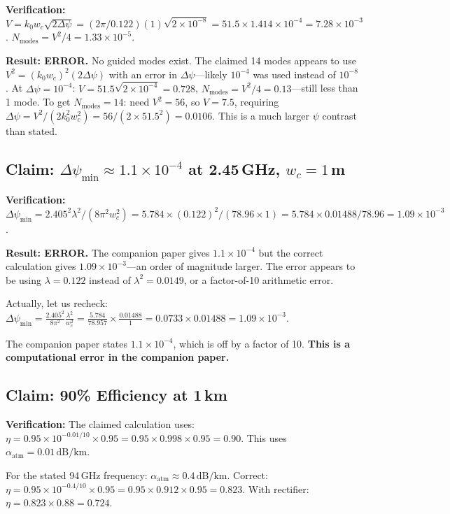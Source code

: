 \documentclass[journal,twocolumn]{IEEEtran}
\begin{document}
\textbf{Verification:}
$V = k_0 w_c \sqrt{2\Delta\psi}
= (2\pi/0.122)(1)\sqrt{2\times10^{-8}}
= 51.5 \times 1.414\times10^{-4} = 7.28\times10^{-3}$.
$N_\text{modes} = V^2/4 = 1.33\times10^{-5}$.

\textbf{Result: ERROR.} No guided modes exist. The claimed 14 modes
appears to use $V^2 = (k_0 w_c)^2(2\Delta\psi)$ with an error in
$\Delta\psi$---likely $10^{-4}$ was used instead of $10^{-8}$.
At $\Delta\psi = 10^{-4}$:
$V = 51.5\sqrt{2\times10^{-4}} = 0.728$,
$N_\text{modes} = V^2/4 = 0.13$---still less than 1 mode.
To get $N_\text{modes} = 14$: need $V^2 = 56$, so $V = 7.5$,
requiring $\Delta\psi = V^2/(2k_0^2 w_c^2) = 56/(2\times51.5^2)
= 0.0106$. This is a much larger $\psi$ contrast than stated.

\subsection{Claim: $\Delta\psi_\text{min} \approx 1.1\times10^{-4}$
at 2.45\,GHz, $w_c = 1$\,m}

\textbf{Verification:}
$\Delta\psi_\text{min} = 2.405^2\lambda^2/(8\pi^2 w_c^2)
= 5.784\times(0.122)^2/(78.96\times1)
= 5.784\times0.01488/78.96 = 1.09\times10^{-3}$.

\textbf{Result: ERROR.} The companion paper gives $1.1\times10^{-4}$
but the correct calculation gives $1.09\times10^{-3}$---an order of
magnitude larger. The error appears to be using $\lambda = 0.122$
instead of $\lambda^2 = 0.0149$, or a factor-of-10 arithmetic error.

Actually, let us recheck:
$\Delta\psi_\text{min} = \frac{2.405^2}{8\pi^2}\frac{\lambda^2}{w_c^2}
= \frac{5.784}{78.957}\times\frac{0.01488}{1} = 0.0733\times0.01488
= 1.09\times10^{-3}$.

The companion paper states $1.1\times10^{-4}$, which is off by a factor
of 10. \textbf{This is a computational error in the companion paper.}

\subsection{Claim: 90\% Efficiency at 1\,km}

\textbf{Verification:} The claimed calculation uses:
$\eta = 0.95 \times 10^{-0.01/10} \times 0.95 = 0.95\times0.998\times0.95 = 0.90$.
This uses $\alpha_\text{atm} = 0.01\,\text{dB/km}$.

For the stated 94\,GHz frequency: $\alpha_\text{atm} \approx 0.4\,\text{dB/km}$.
Correct: $\eta = 0.95\times10^{-0.4/10}\times0.95 = 0.95\times0.912\times0.95 = 0.823$.
With rectifier: $\eta = 0.823\times0.88 = 0.724$.
\end{document}

